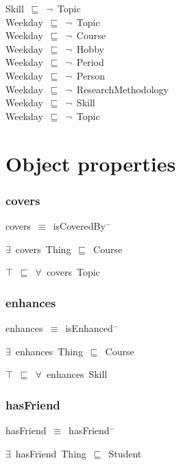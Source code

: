 \documentclass{article}
\begin{document}
Skill~\ensuremath{\sqsubseteq}~\ensuremath{\lnot}~Topic\\
Weekday~\ensuremath{\sqsubseteq}~\ensuremath{\lnot}~Topic\\
Weekday~\ensuremath{\sqsubseteq}~\ensuremath{\lnot}~Course\\
Weekday~\ensuremath{\sqsubseteq}~\ensuremath{\lnot}~Hobby\\
Weekday~\ensuremath{\sqsubseteq}~\ensuremath{\lnot}~Period\\
Weekday~\ensuremath{\sqsubseteq}~\ensuremath{\lnot}~Person\\
Weekday~\ensuremath{\sqsubseteq}~\ensuremath{\lnot}~ResearchMethodology\\
Weekday~\ensuremath{\sqsubseteq}~\ensuremath{\lnot}~Skill\\
Weekday~\ensuremath{\sqsubseteq}~\ensuremath{\lnot}~Topic\\


\section*{Object properties}\subsubsection*{covers}

covers~\ensuremath{\equiv}~isCoveredBy\ensuremath{^-}

\ensuremath{\exists}~covers~Thing~\ensuremath{\sqsubseteq}~Course

\ensuremath{\top}~\ensuremath{\sqsubseteq}~\ensuremath{\forall}~covers~Topic

\subsubsection*{enhances}

enhances~\ensuremath{\equiv}~isEnhanced\ensuremath{^-}

\ensuremath{\exists}~enhances~Thing~\ensuremath{\sqsubseteq}~Course

\ensuremath{\top}~\ensuremath{\sqsubseteq}~\ensuremath{\forall}~enhances~Skill

\subsubsection*{hasFriend}

hasFriend~\ensuremath{\equiv}~hasFriend\ensuremath{^-}

\ensuremath{\exists}~hasFriend~Thing~\ensuremath{\sqsubseteq}~Student
\end{document}
